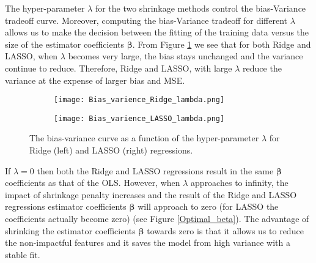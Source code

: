 \documentclass[a4paper]{article}
\begin{document}
The hyper-parameter $\lambda$ for the two shrinkage methods control the  bias-Variance tradeoff curve. Moreover, computing the bias-Variance tradeoff for different $\lambda$ allows us to make the decision between the fitting of the training data versus the size of the estimator coefficients $\mathbf{\beta}$. From Figure \ref{Bias_varienceRidge_LASSO_lambda2} we see that for both Ridge and LASSO, when $\lambda$ becomes very large, the bias stays unchanged and the variance continue to reduce. Therefore, Ridge and LASSO, with large $\lambda$ reduce the variance at the expense of larger bias and MSE.

\begin{figure}[ht]
     \centering
     \begin{subfigure}{.475\textwidth}
         \centering
         \texttt{[image: Bias\_varience\_Ridge\_lambda.png]}
     \end{subfigure}
     \begin{subfigure}{.475\textwidth}
         \centering
         \texttt{[image: Bias\_varience\_LASSO\_lambda.png]}
     \end{subfigure}
    \caption{The bias-variance curve as a function of the hyper-parameter $\lambda$ for Ridge (left) and LASSO (right) regressions.}
    \label{Bias_varienceRidge_LASSO_lambda2}
\end{figure}

If $\lambda=0$ then both the Ridge and LASSO regressions result in the same $\mathbf{\beta}$ coefficients as that of the OLS. However, when  $\lambda$ approaches to infinity, the impact of shrinkage penalty increases and the result of the Ridge and LASSO regressions estimator coefficients $\mathbf{\beta}$ will approach to zero (for LASSO the coefficients actually become zero) (see Figure \ref{Optimal_beta}). The advantage of shrinking the estimator coefficients $\mathbf{\beta}$ towards zero is that it allows us to reduce the non-impactful features and it saves the model from high variance with a stable fit.
\end{document}
